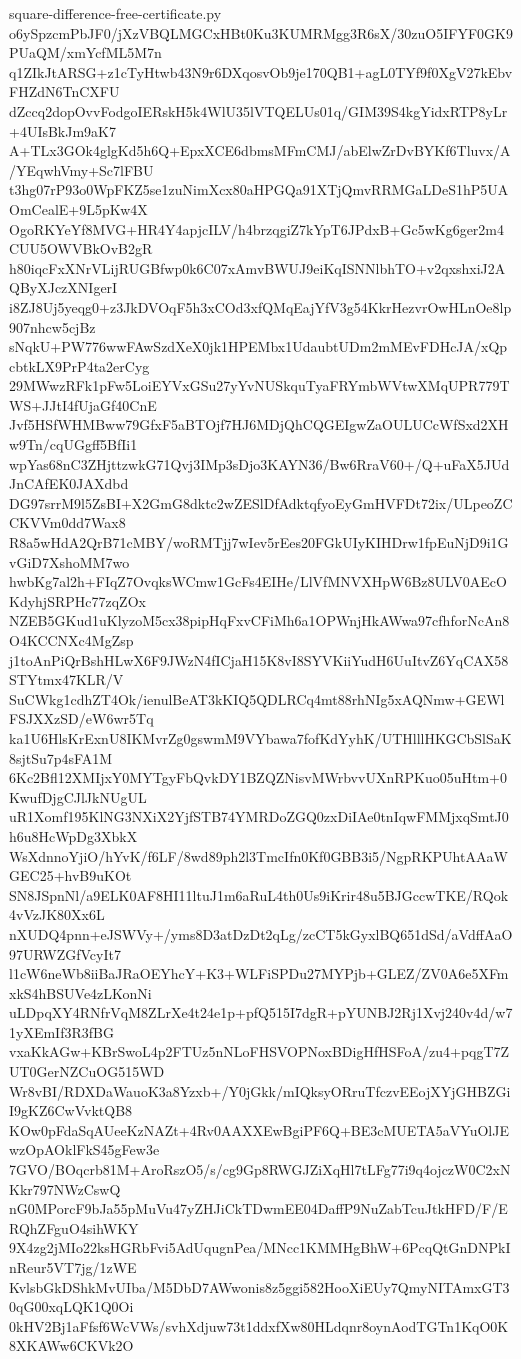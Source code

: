 \documentclass[11pt]{article}
\theoremstyle{definition}
\theoremstyle{remark}
\begin{document}
\begin{filecontents*}[overwrite]{square-difference-free-certificate.py}
o6ySpzcmPbJF0/jXzVBQLMGCxHBt0Ku3KUMRMgg3R6sX/30zuO5IFYF0GK9PUaQM/xmYcfML5M7n
q1ZIkJtARSG+z1cTyHtwb43N9r6DXqosvOb9je170QB1+agL0TYf9f0XgV27kEbvFHZdN6TnCXFU
dZccq2dopOvvFodgoIERskH5k4WlU35lVTQELUs01q/GIM39S4kgYidxRTP8yLr+4UIsBkJm9aK7
A+TLx3GOk4glgKd5h6Q+EpxXCE6dbmsMFmCMJ/abElwZrDvBYKf6Tluvx/A/YEqwhVmy+Sc7lFBU
t3hg07rP93o0WpFKZ5se1zuNimXcx80aHPGQa91XTjQmvRRMGaLDeS1hP5UAOmCealE+9L5pKw4X
OgoRKYeYf8MVG+HR4Y4apjcILV/h4brzqgiZ7kYpT6JPdxB+Gc5wKg6ger2m4CUU5OWVBkOvB2gR
h80iqcFxXNrVLijRUGBfwp0k6C07xAmvBWUJ9eiKqISNNlbhTO+v2qxshxiJ2AQByXJczXNIgerI
i8ZJ8Uj5yeqg0+z3JkDVOqF5h3xCOd3xfQMqEajYfV3g54KkrHezvrOwHLnOe8lp907nhcw5cjBz
sNqkU+PW776wwFAwSzdXeX0jk1HPEMbx1UdaubtUDm2mMEvFDHcJA/xQpcbtkLX9PrP4ta2erCyg
29MWwzRFk1pFw5LoiEYVxGSu27yYvNUSkquTyaFRYmbWVtwXMqUPR779TWS+JJtI4fUjaGf40CnE
Jvf5HSfWHMBww79GfxF5aBTOjf7HJ6MDjQhCQGEIgwZaOULUCcWfSxd2XHw9Tn/cqUGgff5BfIi1
wpYas68nC3ZHjttzwkG71Qvj3IMp3sDjo3KAYN36/Bw6RraV60+/Q+uFaX5JUdJnCAfEK0JAXdbd
DG97srrM9l5ZsBI+X2GmG8dktc2wZESlDfAdktqfyoEyGmHVFDt72ix/ULpeoZCCKVVm0dd7Wax8
R8a5wHdA2QrB71cMBY/woRMTjj7wIev5rEes20FGkUIyKIHDrw1fpEuNjD9i1GvGiD7XshoMM7wo
hwbKg7al2h+FIqZ7OvqksWCmw1GcFs4EIHe/LlVfMNVXHpW6Bz8ULV0AEcOKdyhjSRPHc77zqZOx
NZEB5GKud1uKlyzoM5cx38pipHqFxvCFiMh6a1OPWnjHkAWwa97cfhforNcAn8O4KCCNXc4MgZsp
j1toAnPiQrBshHLwX6F9JWzN4fICjaH15K8vI8SYVKiiYudH6UuItvZ6YqCAX58STYtmx47KLR/V
SuCWkg1cdhZT4Ok/ienulBeAT3kKIQ5QDLRCq4mt88rhNIg5xAQNmw+GEWlFSJXXzSD/eW6wr5Tq
ka1U6HlsKrExnU8IKMvrZg0gswmM9VYbawa7fofKdYyhK/UTHlllHKGCbSlSaK8sjtSu7p4sFA1M
6Kc2Bfl12XMIjxY0MYTgyFbQvkDY1BZQZNisvMWrbvvUXnRPKuo05uHtm+0KwufDjgCJlJkNUgUL
uR1Xomf195KlNG3NXiX2YjfSTB74YMRDoZGQ0zxDiIAe0tnIqwFMMjxqSmtJ0h6u8HcWpDg3XbkX
WsXdnnoYjiO/hYvK/f6LF/8wd89ph2l3TmcIfn0Kf0GBB3i5/NgpRKPUhtAAaWGEC25+hvB9uKOt
SN8JSpnNl/a9ELK0AF8HI11ltuJ1m6aRuL4th0Us9iKrir48u5BJGccwTKE/RQok4vVzJK80Xx6L
nXUDQ4pnn+eJSWVy+/yms8D3atDzDt2qLg/zcCT5kGyxlBQ651dSd/aVdffAaO97URWZGfVcyIt7
l1cW6neWb8iiBaJRaOEYhcY+K3+WLFiSPDu27MYPjb+GLEZ/ZV0A6e5XFmxkS4hBSUVe4zLKonNi
uLDpqXY4RNfrVqM8ZLrXe4t24e1p+pfQ515I7dgR+pYUNBJ2Rj1Xvj240v4d/w71yXEmIf3R3fBG
vxaKkAGw+KBrSwoL4p2FTUz5nNLoFHSVOPNoxBDigHfHSFoA/zu4+pqgT7ZUT0GerNZCuOG515WD
Wr8vBI/RDXDaWauoK3a8Yzxb+/Y0jGkk/mIQksyORruTfczvEEojXYjGHBZGiI9gKZ6CwVvktQB8
KOw0pFdaSqAUeeKzNAZt+4Rv0AAXXEwBgiPF6Q+BE3cMUETA5aVYuOlJEwzOpAOklFkS45gFew3e
7GVO/BOqcrb81M+AroRszO5/s/cg9Gp8RWGJZiXqHl7tLFg77i9q4ojczW0C2xNKkr797NWzCswQ
nG0MPorcF9bJa55pMuVu47yZHJiCkTDwmEE04DaffP9NuZabTcuJtkHFD/F/ERQhZFguO4sihWKY
9X4zg2jMIo22ksHGRbFvi5AdUqugnPea/MNcc1KMMHgBhW+6PcqQtGnDNPkInReur5VT7jg/1zWE
KvlsbGkDShkMvUIba/M5DbD7AWwonis8z5ggi582HooXiEUy7QmyNITAmxGT30qG00xqLQK1Q0Oi
0kHV2Bj1aFfsf6WcVWs/svhXdjuw73t1ddxfXw80HLdqnr8oynAodTGTn1KqO0K8XKAWw6CKVk2O

\end{filecontents*}
\end{document}
